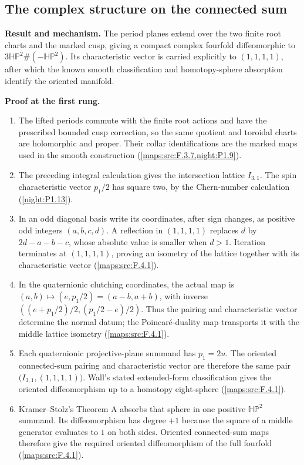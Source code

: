 \documentclass[11pt,a4paper]{article}
\theoremstyle{definition}
\newcommand{\RungZero}[1]{\par\noindent\textbf{Result and mechanism.} #1\par\smallskip}
\newcommand{\RungOne}{\par\Needspace{6\baselineskip}\noindent\textbf{Proof at the first rung.}\par\nobreak\smallskip}
\begin{document}
\subsection{The complex structure on the connected sum}
\RungZero{The period planes extend over the two finite root charts and
the marked cusp, giving a compact complex fourfold diffeomorphic to
$3\mathbb{HP}^2\#(-\mathbb{HP}^2)$.  Its characteristic vector is
carried explicitly to $(1,1,1,1)$, after which the known smooth
classification and homotopy-sphere absorption identify the oriented
manifold.}
\RungOne
\begin{enumerate}[label=\arabic*.]
\item The lifted periods commute with the finite root actions and
  have the prescribed bounded cusp correction, so the same quotient
  and toroidal charts are holomorphic and proper.  Their collar
  identifications are the marked maps used in the smooth construction
  (\cref{maps:src:F.3.7,night:P1.9}).
\item The preceding integral calculation gives the intersection
  lattice $I_{3,1}$.  The spin characteristic vector $p_1/2$ has
  square two, by the Chern-number calculation
  (\cref{night:P1.13}).
\item In an odd diagonal basis write its coordinates, after sign
  changes, as positive odd integers $(a,b,c,d)$.  A reflection in
  $(1,1,1,1)$ replaces $d$ by $2d-a-b-c$, whose absolute value is
  smaller when $d>1$.  Iteration terminates at $(1,1,1,1)$, proving
  an isometry of the lattice together with its characteristic vector
  (\cref{maps:src:F.4.1}).
\item In the quaternionic clutching coordinates, the actual map is
  $(a,b)\mapsto(e,p_1/2)=(a-b,a+b)$, with inverse
  $((e+p_1/2)/2,(p_1/2-e)/2)$.  Thus the pairing and characteristic
  vector determine the normal datum; the Poincar\'e-duality map
  transports it with the middle lattice isometry
  (\cref{maps:src:F.4.1}).
\item Each quaternionic projective-plane summand has $p_1=2u$.
  The oriented connected-sum pairing and characteristic vector are
  therefore the same pair $\bigl(I_{3,1},(1,1,1,1)\bigr)$.
  Wall's stated extended-form classification gives the oriented
  diffeomorphism up to a homotopy eight-sphere
  (\cref{maps:src:F.4.1}).
\item Kramer--Stolz's Theorem A absorbs that sphere in one positive
  $\mathbb{HP}^2$ summand.  Its diffeomorphism has degree $+1$ because
  the square of a middle generator evaluates to $1$ on both sides.
  Oriented connected-sum maps therefore give the required oriented
  diffeomorphism of the full fourfold
  (\cref{maps:src:F.4.1}).
\end{enumerate}
\end{document}
